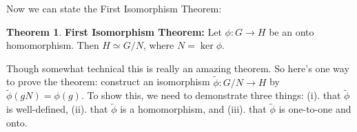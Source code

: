\documentclass{article}
\theoremstyle{definition}
\newtheorem{theorem}{Theorem}[section]
\begin{document}
\bigskip
\noindent
Now we can state the First Isomorphism Theorem:

\medskip
\begin{theorem} {\bf First Isomorphism Theorem:}
Let
$\phi: G \rightarrow H$ be an onto homomorphism.  Then $H \simeq
G/N$, where $N = \ker \phi$.
\end{theorem}

\medskip
\noindent
Though somewhat technical this is really an amazing theorem. 
So here's one way to prove the theorem: construct an isomorphism
$\widetilde{\phi}: G/N \rightarrow H$ by 
$\widetilde{\phi}(gN) = \phi(g)$. To show this, we need to 
demonstrate three things: (i). that $\widetilde{\phi}$ is 
well-defined, (ii). that $\widetilde{\phi}$ is a homomorphism, 
and (iii). that $\widetilde{\phi}$ is one-to-one and onto.
\end{document}
